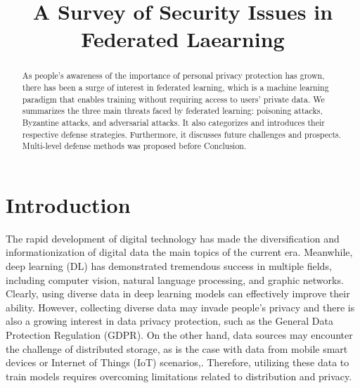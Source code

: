 \documentclass[conference]{IEEEtran}
\begin{document}
\title{A Survey of Security Issues in Federated Laearning}

\author{
    \and

}

\maketitle

\begin{abstract}
    As people's awareness of the importance of personal privacy protection has grown,
    there has been a surge of interest in federated learning,
    which is a machine learning paradigm that enables training without requiring
    access to users' private data. We  summarizes the three main threats faced by federated learning: poisoning attacks, 
    Byzantine attacks, and adversarial attacks. It also categorizes and introduces their respective defense strategies.
    Furthermore, it discusses future challenges and prospects. Multi-level defense methods was proposed before Conclusion.
\end{abstract}



\section{Introduction}
The rapid development of digital technology has made the diversification and informationization
of digital data the main topics of the current era. Meanwhile, deep learning (DL) has
demonstrated tremendous success in multiple fields, including computer vision, natural language
processing, and graphic networks. Clearly, using diverse data in deep learning models can effectively
improve their ability. However, collecting diverse data may invade people's privacy and there is also a growing interest in data privacy protection,
such as the General Data Protection Regulation (GDPR)\cite{b1}. On the other hand, data sources may
encounter the challenge of distributed storage, as is the case with data from mobile smart devices
or Internet of Things (IoT) scenarios\cite{b2},\cite{b3}. Therefore, utilizing these data to train models requires
overcoming limitations related to distribution and privacy\cite{b4}.
\end{document}
